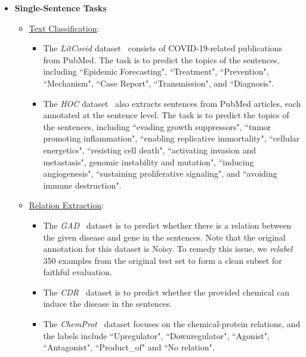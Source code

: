 \documentclass{article} %
\begin{document}
\begin{itemize}[leftmargin=0.3cm]

\item \textbf{Single-Sentence Tasks}
\begin{itemize}[label=$\circ$]
\item \uline{Text Classification}: 

\begin{itemize}
    \item The \textit{LitCovid} dataset~\citep{litcovid} consists of COVID-19-related publications from PubMed. The task is to predict the topics of the sentences, including ``Epidemic Forecasting", ``Treatment", ``Prevention", ``Mechanism", ``Case Report", ``Transmission", and ``Diagnosis".
    \item The \textit{HOC} dataset~\citep{hoc} also extracts sentences from PubMed articles, each annotated at the sentence level. The task is to predict the topics of the sentences, including ``evading growth suppressors", ``tumor promoting inflammation", ``enabling replicative immortality", ``cellular energetics", ``resisting cell death", ``activating invasion and metastasis", genomic instability and mutation", ``inducing angiogenesis", ``sustaining proliferative signaling", and ``avoiding immune destruction".
\end{itemize}


\item \uline{Relation Extraction}:
\begin{itemize}
    \item The \textit{GAD}~\citep{gad} dataset is to predict whether there is a relation between the given disease and gene in the sentences. Note that the original annotation for this dataset is Noisy. To remedy this issue, we \emph{relabel} 350 examples from the original test set to form a clean subset for faithful evaluation.
    \item The \textit{CDR}~\citep{cdr_dataset} dataset is to predict whether the provided chemical can induce the disease in the sentences.
    \item The \textit{ChemProt}~\citep{chemprot} dataset focuses on the chemical-protein relations, and the labels include ``Upregulator", ``Downregulator", ``Agonist", ``Antagonist", ``Product\_of" and ``No relation".
\end{itemize}
\end{itemize}


\end{itemize}
\end{document}
